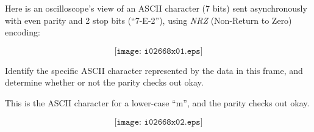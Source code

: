 

Here is an oscilloscope's view of an ASCII character (7 bits) sent asynchronously with even parity and 2 stop bits (``7-E-2''), using {\it NRZ} (Non-Return to Zero) encoding:

$$\texttt{[image: i02668x01.eps]}$$

Identify the specific ASCII character represented by the data in this frame, and determine whether or not the parity checks out okay.







This is the ASCII character for a lower-case ``m'', and the parity checks out okay.







$$\texttt{[image: i02668x02.eps]}$$




